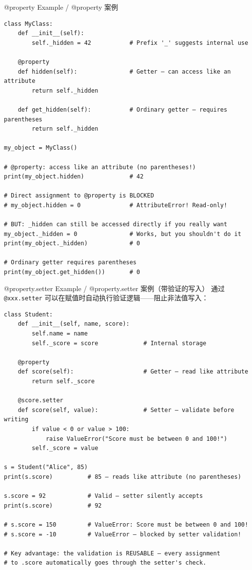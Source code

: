 \documentclass[11pt,a4paper]{report}
\let\oldtexttt\texttt
\renewcommand{\texttt}[1]{\textcolor{mainblue}{\oldtexttt{#1}}}
\begin{document}
\begin{examplebox}{@property Example / @property 案例}
\begin{lstlisting}
class MyClass:
    def __init__(self):
        self._hidden = 42           # Prefix '_' suggests internal use

    @property
    def hidden(self):               # Getter — can access like an attribute
        return self._hidden

    def get_hidden(self):           # Ordinary getter — requires parentheses
        return self._hidden

my_object = MyClass()

# @property: access like an attribute (no parentheses!)
print(my_object.hidden)             # 42

# Direct assignment to @property is BLOCKED
# my_object.hidden = 0              # AttributeError! Read-only!

# BUT: _hidden can still be accessed directly if you really want
my_object._hidden = 0               # Works, but you shouldn't do it
print(my_object._hidden)            # 0

# Ordinary getter requires parentheses
print(my_object.get_hidden())       # 0
\end{lstlisting}
\end{examplebox}

\begin{examplebox}{@property.setter Example / @property.setter 案例（带验证的写入）}
    通过 \texttt{@xxx.setter} 可以在赋值时自动执行验证逻辑——阻止非法值写入：
\begin{lstlisting}
class Student:
    def __init__(self, name, score):
        self.name = name
        self._score = score             # Internal storage

    @property
    def score(self):                    # Getter — read like attribute
        return self._score

    @score.setter
    def score(self, value):             # Setter — validate before writing
        if value < 0 or value > 100:
            raise ValueError("Score must be between 0 and 100!")
        self._score = value

s = Student("Alice", 85)
print(s.score)          # 85 — reads like attribute (no parentheses)

s.score = 92            # Valid — setter silently accepts
print(s.score)          # 92

# s.score = 150         # ValueError: Score must be between 0 and 100!
# s.score = -10         # ValueError — blocked by setter validation!

# Key advantage: the validation is REUSABLE — every assignment
# to .score automatically goes through the setter's check.
\end{lstlisting}
\end{examplebox}
\end{document}
